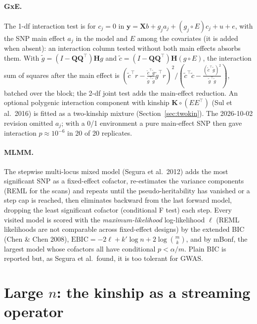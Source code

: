 \documentclass[11pt]{article}
\newcommand{\y}{\mathbf{y}}
\newcommand{\K}{\mathbf{K}}
\newcommand{\X}{\mathbf{X}}
\newcommand{\Q}{\mathbf{Q}}
\newcommand{\Hm}{\mathbf{H}}
\begin{document}
\paragraph{GxE.} The 1-df interaction test is for $c_j = 0$ in
$\y = \X b + g_j a_j + (g_j \circ E) c_j + u + e$, with the SNP main
effect $a_j$ in the model and $E$ among the covariates (it is added when
absent): an interaction column tested without both main effects absorbs
them. With $\tilde g = (I-\Q\Q^\top)\Hm g$ and
$\tilde c = (I-\Q\Q^\top)\Hm (g\circ E)$, the interaction sum of
squares after the main effect is
$(\tilde c^\top r - \tfrac{\tilde c^\top\tilde g}{\tilde g^\top\tilde g}\tilde g^\top r)^2
 / (\tilde c^\top\tilde c - \tfrac{(\tilde c^\top\tilde g)^2}{\tilde g^\top\tilde g})$,
batched over the block; the 2-df joint test adds the main-effect
reduction. An optional polygenic interaction component with kinship
$\K\circ(EE^\top)$ (Sul et al.\ 2016) is fitted as a two-kinship mixture
(Section~\ref{sec:twokin}). The 2026-10-02 revision omitted $a_j$; with a
0/1 environment a pure main-effect SNP then gave interaction
$p \approx 10^{-6}$ in 20 of 20 replicates.

\paragraph{MLMM.} The stepwise multi-locus mixed model (Segura et al.\
2012) adds the most significant SNP as a fixed-effect cofactor,
re-estimates the variance components (REML for the scans) and repeats
until the pseudo-heritability has vanished or a step cap is reached,
then eliminates backward from the last forward model, dropping the
least significant cofactor (conditional F test) each step. Every
visited model is scored with the \emph{maximum-likelihood}
log-likelihood $\ell$ (REML likelihoods are not comparable across
fixed-effect designs) by the extended BIC (Chen \& Chen 2008),
$\mathrm{EBIC} = -2\ell + k'\log n + 2\log\binom{m}{k}$, and by mBonf, the
largest model whose cofactors all have conditional $p < \alpha/m$.
Plain BIC is reported but, as Segura et al.\ found, it is too tolerant
for GWAS.

\section{Large \texorpdfstring{$n$}{n}: the kinship as a streaming operator}
\label{sec:operator}
\end{document}
